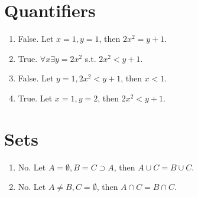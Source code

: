 \documentclass[sigconf]{acmart}
\begin{document}
\section{Quantifiers}
\begin{enumerate}
	\item False. Let $x = 1, y = 1$, then $2x^2 = y + 1$.
	\item True. $\forall x \exists y = 2x^2$ s.t. $2x^2 < y + 1$.
	\item False. Let $y = 1, 2x^2 < y + 1$, then $x < 1$.
	\item True. Let $x = 1, y = 2$, then $2x^2 < y + 1$.
\end{enumerate}

\section{Sets}
\begin{enumerate}
	\item No. Let $A = \emptyset, B = C \supset A$, then $A \cup C = B \cup C$.
	\item No. Let $A \ne B, C = \emptyset$, then $A \cap C = B \cap C$.
\end{enumerate}


% 
\end{document}
